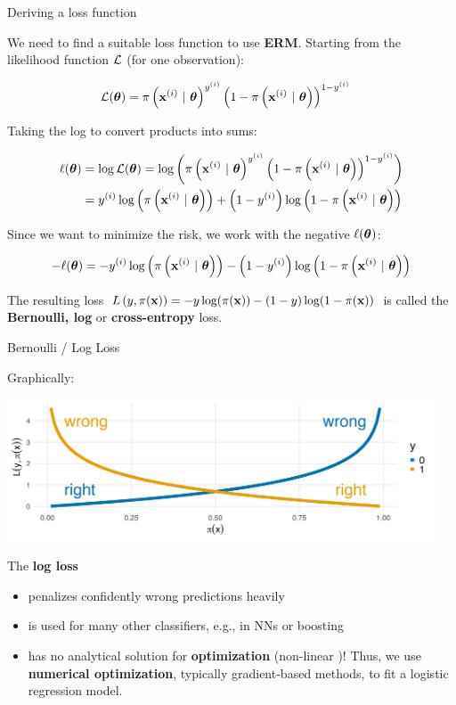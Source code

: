 \documentclass[11pt,compress,t,notes=noshow, xcolor=table]{beamer}
\begin{document}
\begin{vbframe}{Deriving a loss function}

We need to find a suitable loss function to use \textbf{ERM}. Starting from the likelihood function $\mathcal{L}$ (for one observation):
\begin{small}
\begin{align*}
\LLt %
     &= \pixit^{\yi} \left(1-\pixit\right)^{1-\yi}
\end{align*}
\end{small}
Taking the log to convert products into sums:
\begin{small}
\begin{align*}
\ell(\bm{\theta}) &= \log \mathcal{L}(\bm{\theta}) = \log\left(\pi\left(\mathbf{x}^{(i)} ~|~ \bm{\theta}\right)^{y^{(i)}} \left(1-\pi\left(\mathbf{x}^{(i)} ~|~ \bm{\theta}\right)\right)^{1-y^{(i)}}\right) \\
       &= y^{(i)} \log\left(\pi\left(\mathbf{x}^{(i)} ~|~ \bm{\theta}\right)\right) + \left(1-y^{(i)}\right)\log\left(1-\pi\left(\mathbf{x}^{(i)} ~|~ \bm{\theta}\right)\right)
\end{align*}
\end{small}

Since we want to minimize the risk, we work with the negative $\ell(\bm{\theta})$:
\begin{small}
\begin{align*}
- \ell(\bm{\theta}) = - y^{(i)} \log\left(\pi\left(\mathbf{x}^{(i)} ~|~ \bm{\theta}\right)\right) - \left(1-y^{(i)}\right)\log\left(1-\pi\left(\mathbf{x}^{(i)} ~|~ \bm{\theta}\right)\right)
\end{align*}
\end{small}

The resulting loss $L\left(y, \pi(\mathbf{x})\right) = -y\log(\pi(\mathbf{x}))-(1-y)\log(1-\pi(\mathbf{x}))$ is called the \textbf{Bernoulli, log} or \textbf{cross-entropy} loss.

\end{vbframe}

\begin{vbframe}{Bernoulli / Log Loss}

Graphically:

{\centering \includegraphics[width=0.95\textwidth]{figure/log_loss.png}

}

The \textbf{log loss}
\begin{itemize}
  \item penalizes confidently wrong predictions heavily
  \item is used for many other classifiers, e.g., in NNs or boosting 
  \item has no analytical solution for \textbf{optimization} (non-linear%
  )! Thus, we use \textbf{numerical optimization}, typically gradient-based methods, to fit a logistic regression model.
\end{itemize}


\end{vbframe}
\end{document}
